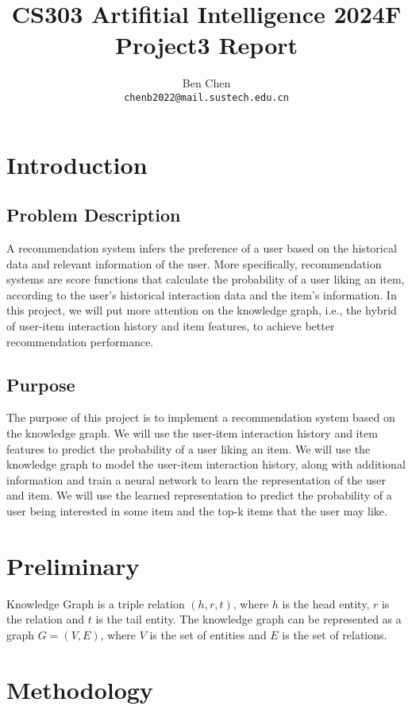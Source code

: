 \documentclass{article}
\title{\textbf{CS303 Artifitial Intelligence 2024F Project3 Report}}
\author{Ben Chen \\ \texttt{chenb2022@mail.sustech.edu.cn}}
\begin{document}
\maketitle

\section{Introduction}

\subsection{Problem Description}

A recommendation system infers the preference of a user based on the historical data and relevant information of the user. More specifically, recommendation systems are score functions that calculate the probability of a user liking an item, according to the user's historical interaction data and the item's information. In this project, we will put more attention on the knowledge graph, i.e., the hybrid of user-item interaction history and item features, to achieve better recommendation performance.

\subsection{Purpose}

The purpose of this project is to implement a recommendation system based on the knowledge graph. We will use the user-item interaction history and item features to predict the probability of a user liking an item. We will use the knowledge graph to model the user-item interaction history, along with additional information and train a neural network to learn the representation of the user and item. We will use the learned representation to predict the probability of a user being interested in some item and the top-k items that the user may like.

\section{Preliminary}

Knowledge Graph is a triple relation $(h, r, t)$, where $h$ is the head entity, $r$ is the relation and $t$ is the tail entity. The knowledge graph can be represented as a graph $G = (V, E)$, where $V$ is the set of entities and $E$ is the set of relations. 

\section{Methodology}
\end{document}
